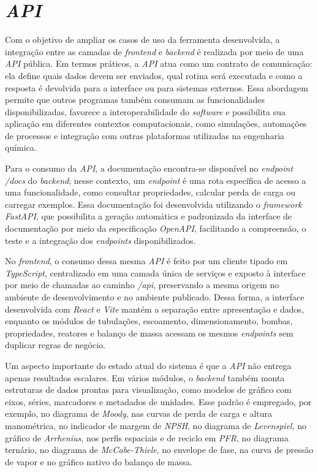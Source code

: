 \section{\textit{API}}

Com o objetivo de ampliar os casos de uso da ferramenta desenvolvida, a integração entre as camadas de \textit{frontend} e \textit{backend} é realizada por meio de uma \textit{API} pública. Em termos práticos, a \textit{API} atua como um contrato de comunicação: ela define quais dados devem ser enviados, qual rotina será executada e como a resposta é devolvida para a interface ou para sistemas externos. Essa abordagem permite que outros programas também consumam as funcionalidades disponibilizadas, favorece a interoperabilidade do \textit{software} e possibilita sua aplicação em diferentes contextos computacionais, como simulações, automações de processos e integração com outras plataformas utilizadas na engenharia química.

Para o consumo da \textit{API}, a documentação encontra-se disponível no \textit{endpoint} \textit{/docs} do \textit{backend}; nesse contexto, um \textit{endpoint} é uma rota específica de acesso a uma funcionalidade, como consultar propriedades, calcular perda de carga ou carregar exemplos. Essa documentação foi desenvolvida utilizando o \textit{framework} \textit{FastAPI}, que possibilita a geração automática e padronizada da interface de documentação por meio da especificação \textit{OpenAPI}, facilitando a compreensão, o teste e a integração dos \textit{endpoints} disponibilizados.

No \textit{frontend}, o consumo dessa mesma \textit{API} é feito por um cliente tipado em \textit{TypeScript}, centralizado em uma camada única de serviços e exposto à interface por meio de chamadas ao caminho \textit{/api}, preservando a mesma origem no ambiente de desenvolvimento e no ambiente publicado. Dessa forma, a interface desenvolvida com \textit{React} e \textit{Vite} mantém a separação entre apresentação e dados, enquanto os módulos de tubulações, escoamento, dimensionamento, bombas, propriedades, reatores e balanço de massa acessam os mesmos \textit{endpoints} sem duplicar regras de negócio.

Um aspecto importante do estado atual do sistema é que a \textit{API} não entrega apenas resultados escalares. Em vários módulos, o \textit{backend} também monta estruturas de dados prontas para visualização, como modelos de gráfico com eixos, séries, marcadores e metadados de unidades. Esse padrão é empregado, por exemplo, no diagrama de \textit{Moody}, nas curvas de perda de carga e altura manométrica, no indicador de margem de \textit{NPSH}, no diagrama de \textit{Levenspiel}, no gráfico de \textit{Arrhenius}, nos perfis espaciais e de reciclo em \textit{PFR}, no diagrama ternário, no diagrama de \textit{McCabe-Thiele}, no envelope de fase, na curva de pressão de vapor e no gráfico nativo do balanço de massa.

